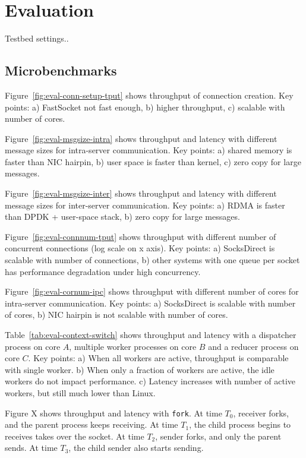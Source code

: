 \section{Evaluation}
\label{sec:evaluation}

Testbed settings..

\subsection{Microbenchmarks}

Figure~\ref{fig:eval-conn-setup-tput} shows throughput of connection creation. Key points: a) FastSocket not fast enough, b) higher throughput, c) scalable with number of cores.

Figure~\ref{fig:eval-msgsize-intra} shows throughput and latency with different message sizes for intra-server communication. Key points: a) shared memory is faster than NIC hairpin, b) user space is faster than kernel, c) zero copy for large messages.

Figure~\ref{fig:eval-msgsize-inter} shows throughput and latency with different message sizes for inter-server communication. Key points: a) RDMA is faster than DPDK + user-space stack, b) zero copy for large messages.

Figure~\ref{fig:eval-connnum-tput} shows throughput with different number of concurrent connections (log scale on x axis). Key points: a) SocksDirect is scalable with number of connections, b) other systems with one queue per socket has performance degradation under high concurrency.

Figure~\ref{fig:eval-cornum-ipc} shows throughput with different number of cores for intra-server communication. Key points: a) SocksDirect is scalable with number of cores, b) NIC hairpin is not scalable with number of cores.

Table~\ref{tab:eval-context-switch} shows throughput and latency with a dispatcher process on core $A$, multiple worker processes on core $B$ and a reducer process on core $C$. Key points: a) When all workers are active, throughput is comparable with single worker. b) When only a fraction of workers are active, the idle workers do not impact performance. c) Latency increases with number of active workers, but still much lower than Linux.

Figure X shows throughput and latency with \texttt{fork}. At time $T_0$, receiver forks, and the parent process keeps receiving. At time $T_1$, the child process begins to receives takes over the socket. At time $T_2$, sender forks, and only the parent sends. At time $T_3$, the child sender also starts sending.

